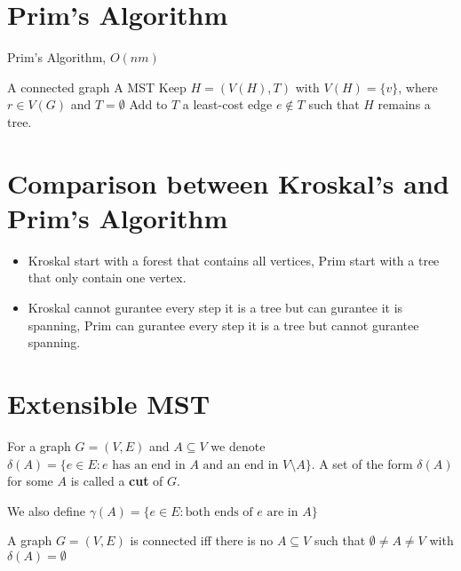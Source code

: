 		\section{Prim's Algorithm}
			\begin{algorithm}
				\caption{Prim's Algorithm, $O(nm)$}
				\begin{algorithmic}
					\Require A connected graph
					\Ensure A MST
					\State Keep $H = (V(H), T)$ with $V(H) = \{v\}$, where $r\in V(G)$ and $T=\emptyset$
						\State Add to $T$ a least-cost edge $e \notin T$ such that $H$ remains a tree.
					\EndWhile
				\end{algorithmic}
			\end{algorithm}

		\section{Comparison between Kroskal's and Prim's Algorithm}
			\begin{itemize}
				\item Kroskal start with a forest that contains all vertices, Prim start with a tree that only contain one vertex.
				\item Kroskal cannot gurantee every step it is a tree but can gurantee it is spanning, Prim can gurantee every step it is a tree but cannot gurantee spanning.
			\end{itemize}

		\section{Extensible MST}
			\begin{definition}[cut]
				For a graph $G=(V, E)$ and $A \subseteq V$ we denote $\delta(A) = \{e \in E :\text{$e$ has an end in $A$ and an end in $V\setminus A$}\}$. A set of the form $\delta(A)$ for some $A$ is called a \textbf{cut} of $G$.
			\end{definition}

			\begin{definition}
				We also define $\gamma(A) = \{e\in E: \text{both ends of $e$ are in $A$}\}$
			\end{definition}

			\begin{theorem}
				A graph $G=(V, E)$ is connected iff there is no $A\subseteq V$ such that $\emptyset \ne A \ne V$ with $\delta(A) = \emptyset$
			\end{theorem}

